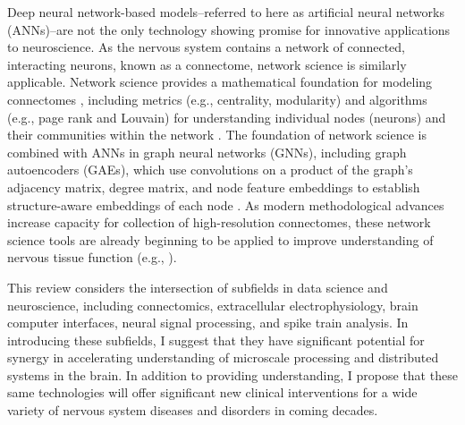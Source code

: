 \documentclass[11pt]{article}
\begin{document}
Deep neural network-based models--referred to here as artificial neural networks (ANNs)--are not the only technology showing promise for innovative applications to neuroscience. As the nervous system contains a network of connected, interacting neurons, known as a connectome, network science is similarly applicable. Network science provides a mathematical foundation for modeling connectomes \cite{emmons2015connectomics, wikipedia2025networkscience, wikipedia2025neuron, wikipedia2025bnn, wikipedia2025connectome}, including metrics (e.g., centrality, modularity) and algorithms (e.g., page rank and Louvain) for understanding individual nodes (neurons) and their communities within the network \cite{wikipedia2025networkscience, wikipedia2025pagerank, wikipedia2025louvain}. The foundation of network science is combined with ANNs in graph neural networks (GNNs), including graph autoencoders (GAEs), which use convolutions on a product of the graph's adjacency matrix, degree matrix, and node feature embeddings to establish structure-aware embeddings of each node \cite{velickovic2018graphattentionnetworks, wikipedia2025gnn}. As modern methodological advances increase capacity for collection of high-resolution connectomes, these network science tools are already beginning to be applied to improve understanding of nervous tissue function (e.g., \cite{srinivasan2025gnnconnectome, neudorf2022gnnconnectome}).

This review considers the intersection of subfields in data science and neuroscience, including connectomics, extracellular electrophysiology, brain computer interfaces, neural signal processing, and spike train analysis. In introducing these subfields, I suggest that they have significant potential for synergy in accelerating understanding of microscale processing and distributed systems in the brain. In addition to providing understanding, I propose that these same technologies will offer significant new clinical interventions for a wide variety of nervous system diseases and disorders in coming decades.
\end{document}
